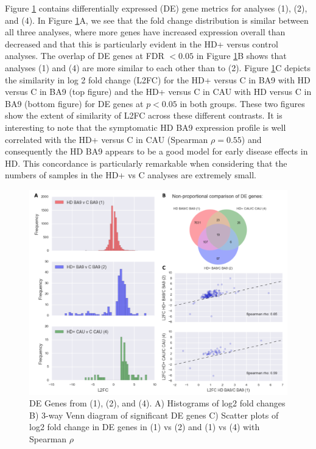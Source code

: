\documentclass[fleqn,10pt,table]{wlscirep}
\begin{document}
Figure \ref{fig:de_genes} contains differentially expressed (DE) gene metrics for analyses (1), (2), and (4).
In Figure \ref{fig:de_genes}A, we see that the fold change distribution is similar between all three analyses, where more genes have increased expression overall than decreased and that this is particularly evident in the HD+ versus control analyses.
The overlap of DE genes at FDR $< 0.05$ in Figure \ref{fig:de_genes}B shows that analyses (1) and (4) are more similar to each other than to (2).
Figure \ref{fig:de_genes}C depicts the similarity in log 2 fold change (L2FC) for the HD+ versus C in BA9 with HD versus C in BA9 (top figure) and the HD+ versus C in CAU with HD versus C in BA9 (bottom figure) for DE genes at $p<0.05$ in both groups.
These two figures show the extent of similarity of L2FC across these different contrasts.
It is interesting to note that the symptomatic HD BA9 expression profile is well correlated with the HD+ versus C in CAU (Spearman $\rho=0.55$) and consequently the HD BA9 appears to be a good model for early disease effects in HD.
This concordance is particularly remarkable when considering that the numbers of samples in the HD+ vs C analyses are extremely small.


\begin{figure}[ht]
\centering
\includegraphics[width=0.65\linewidth]{Histo_venn.png}
\caption{DE Genes from (1), (2), and (4). A) Histograms of log2 fold changes B) 3-way Venn diagram of significant DE genes C) Scatter plots of log2 fold change in DE genes in (1) vs (2) and (1) vs (4) with Spearman $\rho$ \label{fig:de_genes}}
\end{figure}
\end{document}
